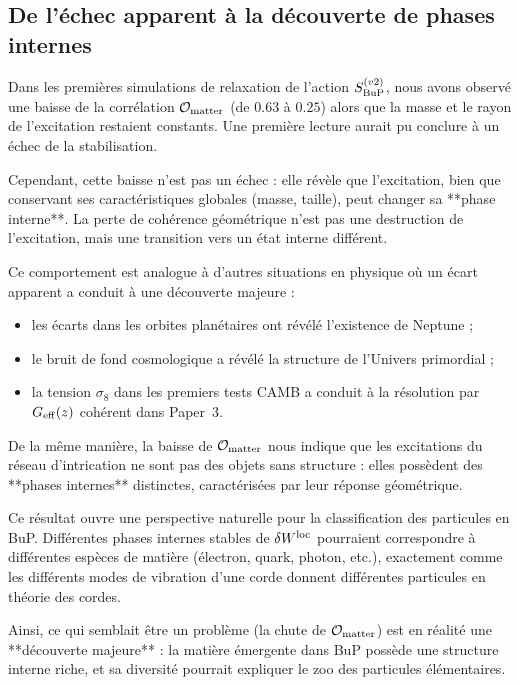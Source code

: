 \documentclass[11pt,a4paper]{article}
\begin{document}
\subsection{De l'échec apparent à la découverte de phases internes}

Dans les premières simulations de relaxation de l'action \(S_{\rm BuP}^{(v2)}\),
nous avons observé une baisse de la corrélation \(\mathcal{O}_{\rm matter}\)
(de \(0.63\) à \(0.25\)) alors que la masse et le rayon de l'excitation
restaient constants. Une première lecture aurait pu conclure à un échec
de la stabilisation.

Cependant, cette baisse n'est pas un échec : elle révèle que l'excitation,
bien que conservant ses caractéristiques globales (masse, taille), peut
changer sa **phase interne**. La perte de cohérence géométrique n'est pas
une destruction de l'excitation, mais une transition vers un état interne
différent.

Ce comportement est analogue à d'autres situations en physique où un écart
apparent a conduit à une découverte majeure :

\begin{itemize}
  \item les écarts dans les orbites planétaires ont révélé l'existence de Neptune ;
  \item le bruit de fond cosmologique a révélé la structure de l'Univers primordial ;
  \item la tension \(\sigma_8\) dans les premiers tests CAMB a conduit à la
        résolution par \(G_{\rm eff}(z)\) cohérent dans Paper~3.
\end{itemize}

De la même manière, la baisse de \(\mathcal{O}_{\rm matter}\) nous indique
que les excitations du réseau d'intrication ne sont pas des objets sans
structure : elles possèdent des **phases internes** distinctes, caractérisées
par leur réponse géométrique.

Ce résultat ouvre une perspective naturelle pour la classification des
particules en BuP. Différentes phases internes stables de \(\delta W^{\rm loc}\)
pourraient correspondre à différentes espèces de matière (électron, quark,
photon, etc.), exactement comme les différents modes de vibration d'une corde
donnent différentes particules en théorie des cordes.

Ainsi, ce qui semblait être un problème (la chute de \(\mathcal{O}_{\rm matter}\))
est en réalité une **découverte majeure** : la matière émergente dans BuP possède
une structure interne riche, et sa diversité pourrait expliquer le zoo des
particules élémentaires.
\end{document}
